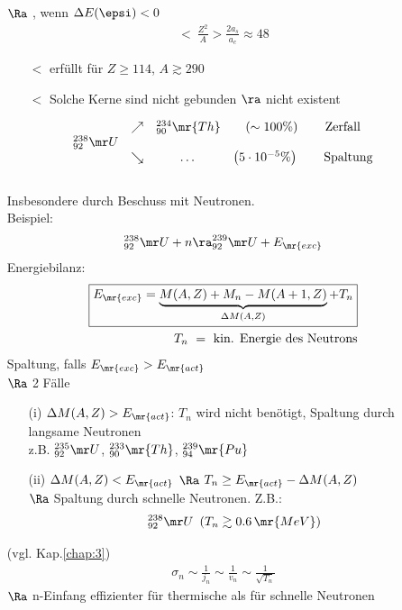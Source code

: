 \begin{itemize}
\item[$\Ra$] , wenn $\Delta E (\epsi) < 0$
\begin{align}
\lt \ \boxed{\frac{Z^2}{A} > \frac{2 a_s}{a_c} \approx 48}
\end{align}
\begin{itemize}
\item[$\lt$] erfüllt für $Z \geq 114$, $A \gtrsim 290$
\item[$\lt$] Solche Kerne sind nicht gebunden $\ra$ nicht existent
\end{itemize}
\begin{align}
\begin{matrix}
 & \nearrow & ^{234}_{90}\mr{Th} & \left(\sim 100 \%\right) \qquad \text{Zerfall}\\
^{238}_{92} \mr U & & & \\
 & \searrow & \dots & \left(5\cdot 10^{-5}\%\right) \qquad \text{Spaltung}
\end{matrix}
\end{align}
\\
Insbesondere durch Beschuss mit Neutronen.\\
Beispiel:
\begin{align*}
^{238}_{92} \mr U + n \ra ^{239}_{92} \mr U + E_\mr{exc}
\end{align*}
Energiebilanz:
\begin{align}
\boxed{E_\mr{exc} = \underbrace{M(A,Z) + M_n - M(A+1, Z)}_{\Delta M (A,Z)} + T_n}\\
 T_n \ = \ \text{kin. Energie des Neutrons}\nonumber
\end{align}
Spaltung, falls $E_\mr{exc} > E_\mr{act}$\\
$\Ra$ 2 Fälle
\begin{itemize}
\item[(i)] $\Delta M (A,Z) > E_\mr{act}$: $T_n$ wird \glqq nicht benötigt\grqq{}, Spaltung durch langsame Neutronen\\
z.B. $^{235}_{92}\mr U$, $^{233}_{90}\mr{Th}$, $^{239}_{94} \mr{Pu}$
\item[(ii)] $\Delta M(A,Z) < E_\mr{act}$ $\Ra$ $T_n \geq E_\mr{act} - \Delta M(A,Z)$\\
$\Ra$ Spaltung durch schnelle Neutronen. Z.B.:
\begin{align*}
^{238}_{92}\mr U \ \left( T_n \gtrsim 0.6\,\mr{MeV}\right)
\end{align*}
\end{itemize}
 (vgl. Kap.\ref{chap:3})
\begin{align}
\boxed{\sigma_n \sim \frac{1}{j_n} \sim \frac{1}{v_n} \sim \frac{1}{\sqrt{T_n}}}
\end{align}
$\Ra$ n-Einfang  effizienter für thermische als für schnelle Neutronen
\end{itemize}
